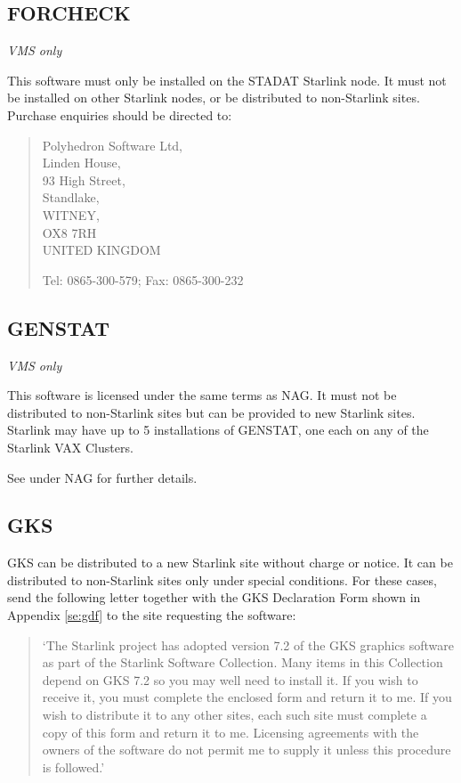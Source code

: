 \subsection {FORCHECK}

{\em VMS only}

This software must only be installed on the STADAT Starlink node.
It must not be installed on other Starlink nodes, or be distributed to
non-Starlink sites.
Purchase enquiries should be directed to:

\begin{verse}
Polyhedron Software Ltd,\\
Linden House,\\
93 High Street,\\
Standlake,\\
WITNEY,\\
OX8 7RH\\
UNITED KINGDOM

Tel: 0865-300-579;  \hspace{10mm} Fax: 0865-300-232
\end{verse}

\subsection {GENSTAT}

{\em VMS only}

This software is licensed under the same terms as NAG. It must not be
distributed to non-Starlink sites but can be provided to new Starlink sites.
Starlink may have up to 5 installations of GENSTAT, one each on any of the 
Starlink VAX Clusters.

See under NAG for further details.

\subsection {GKS}

GKS can be distributed to a new Starlink site without charge or notice.
It can be distributed to non-Starlink sites only under special conditions.
For these cases, send the following letter together with the GKS Declaration
Form shown in Appendix \ref{se:gdf} to the site requesting the software:

\begin{quotation}
`The Starlink project has adopted version 7.2 of the GKS graphics software as
part of the Starlink Software Collection. Many items in this Collection depend
on GKS 7.2 so you may well need to install it. If you wish to receive it, you
must complete the enclosed form and return it to me. If you wish to distribute
it to any other sites, each such site must complete a copy of this form and
return it to me. Licensing agreements with the owners of the software do not
permit me to supply it unless this procedure is followed.'
\end{quotation}


